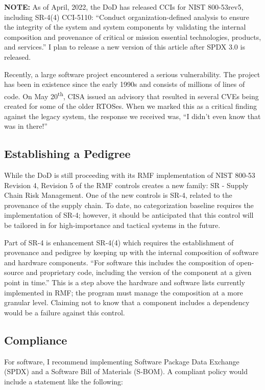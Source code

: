 \textbf{NOTE: }As of April, 2022, the DoD has released CCIs for NIST 800-53rev5, including SR-4(4) CCI-5110: ``Conduct organization-defined analysis to ensure the integrity of the system and system components by validating the internal composition and provenance of critical or mission essential technologies, products, and services.'' I plan to release a new version of this article after SPDX 3.0 is released.

Recently, a large software project encountered a serious vulnerability. The project has been in existence since the early 1990s and consists of millions of lines of code. On May 20\textsuperscript{th}, CISA issued an advisory that resulted in several CVEs being created for some of the older RTOSes.\autocite{20210705:ics21-119-04} When we marked this as a critical finding against the legacy system, the response we received was, ``I didn't even know that was in there!''

\subsection{Establishing a Pedigree}

While the DoD is still proceeding with its RMF implementation of NIST 800-53 Revision 4, Revision 5 of the RMF controls creates a new family: SR - Supply Chain Risk Management. One of the new controls is SR-4, related to the provenance of the supply chain. To date, no categorization baseline requires the implementation of SR-4; however, it should be anticipated that this control will be tailored in for high-importance and tactical systems in the future. 

Part of SR-4 is enhancement SR-4(4) which requires the establishment of provenance and pedigree by keeping up with the internal composition of software and hardware components. ``For software this includes the composition of open-source and proprietary code, including the version of the component at a given point in time.''\autocite[\pno~66]{20210705:nist80053rev5} This is a step above the hardware and software lists currently implemented in RMF; the program must manage the composition at a more granular level. Claiming not to know that a component includes a dependency would be a failure against this control.

\subsection{Compliance}

For software, I recommend implementing Software Package Data Exchange (SPDX) and a Software Bill of Materials (S-BOM). A compliant policy would include a statement like the following:

